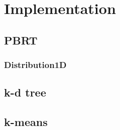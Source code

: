 \chapter{Implementation}
\label{ch:Implementation}

\section{PBRT}
\subsection{Distribution1D}

\section{k-d tree}

\section{k-means}

